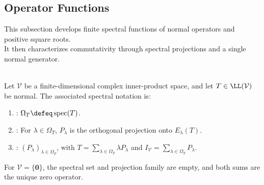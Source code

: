 \subsection{Operator Functions}


%

This subsection develops finite spectral functions of normal operators and positive square roots.\\
It then characterizes commutativity through spectral projections and a single normal generator.

\begin{definition} \label{def:normal-spectral-resolution-notation} \\
Let $\mathcal{V}$ be a finite-dimensional complex inner-product space, and let $T\in\LL(\mathcal{V})$ be normal. The associated spectral notation is:
\begin{enumerate}[label=(\roman*)]
\setlength{\itemsep}{0pt}
\item {}: $\Omega_T\defeq\operatorname{spec}(T)$.
\item {}: For $\lambda\in\Omega_T$, $P_{\lambda}$ is the orthogonal projection onto $E_{\lambda}(T)$.
\item {}: $(P_{\lambda})_{\lambda\in\Omega_T}$, with $T=\sum\limits_{\lambda\in\Omega_T}\lambda P_{\lambda}$ and $I_{\mathcal{V}}=\sum\limits_{\lambda\in\Omega_T}P_{\lambda}$.
\end{enumerate}
For $\mathcal{V}=\{\mathbf{0}\}$, the spectral set and projection family are empty, and both sums are the unique zero operator.
\end{definition}

